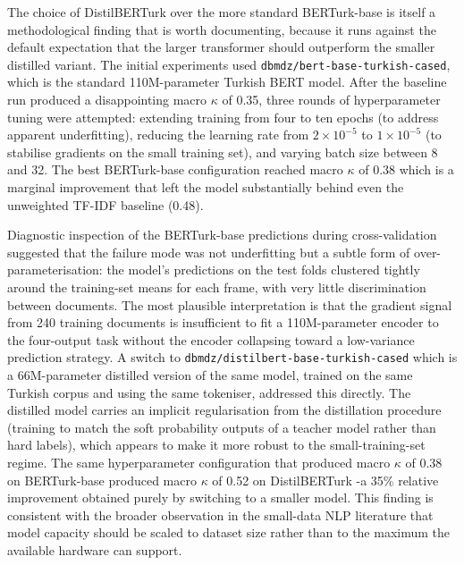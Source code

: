 \documentclass[12pt, journal]{IEEEtran}
\begin{document}
The choice of DistilBERTurk over the more standard BERTurk-base is itself a methodological finding that is worth documenting, because it runs against the default expectation that the larger transformer should outperform the smaller distilled variant. The initial experiments used \texttt{dbmdz/bert-base-turkish-cased}, which is the standard 110M-parameter Turkish BERT model. After the baseline run produced a disappointing macro $\kappa$ of 0.35, three rounds of hyperparameter tuning were attempted: extending training from four to ten epochs (to address apparent underfitting), reducing the learning rate from $2 \times 10^{-5}$ to $1 \times 10^{-5}$ (to stabilise gradients on the small training set), and varying batch size between 8 and 32. The best BERTurk-base configuration reached macro $\kappa$ of 0.38 which is a marginal improvement that left the model substantially behind even the unweighted TF-IDF baseline (0.48).

Diagnostic inspection of the BERTurk-base predictions during cross-validation suggested that the failure mode was not underfitting but a subtle form of over-parameterisation: the model's predictions on the test folds clustered tightly around the training-set means for each frame, with very little discrimination between documents. The most plausible interpretation is that the gradient signal from 240 training documents is insufficient to fit a 110M-parameter encoder to the four-output task without the encoder collapsing toward a low-variance prediction strategy. A switch to \texttt{dbmdz/distilbert-base-turkish-cased} which is a 66M-parameter distilled version of the same model, trained on the same Turkish corpus and using the same tokeniser, addressed this directly. The distilled model carries an implicit regularisation from the distillation procedure (training to match the soft probability outputs of a teacher model rather than hard labels), which appears to make it more robust to the small-training-set regime. The same hyperparameter configuration that produced macro $\kappa$ of 0.38 on BERTurk-base produced macro $\kappa$ of 0.52 on DistilBERTurk -a 35\% relative improvement obtained purely by switching to a smaller model. This finding is consistent with the broader observation in the small-data NLP literature that model capacity should be scaled to dataset size rather than to the maximum the available hardware can support.
\end{document}
